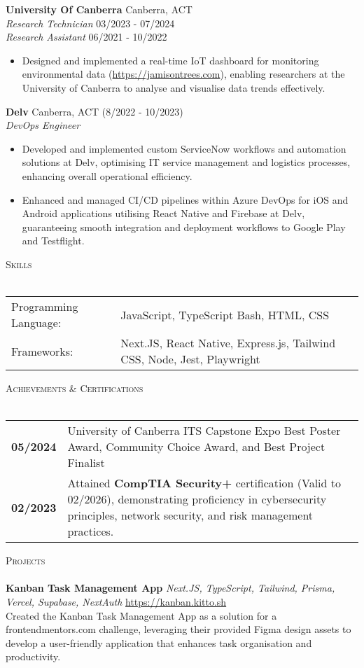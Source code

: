 \documentclass[a4paper]{article}
\newcommand{\lineunder} {
    \vspace*{-8pt} \\
    \hspace*{-18pt} \hrulefill \\
}
\newcommand{\header} [1] {
    {\hspace*{-18pt}\vspace*{6pt} \textsc{#1}}
    \vspace*{-6pt} \lineunder
}
\begin{document}
      \textbf{University Of Canberra} \hfill Canberra, ACT\\
          \textit{Research Technician} \hfill 03/2023 - 07/2024\\
          \textit{Research Assistant} \hfill 06/2021 - 10/2022\\
\begin{itemize} \itemsep 1pt
      \item Designed and implemented a real-time IoT dashboard for monitoring environmental data (\url{https://jamisontrees.com}), enabling researchers at the University of Canberra to analyse and visualise data trends effectively.
\end{itemize}
      \textbf{Delv} \hfill Canberra, ACT (8/2022 - 10/2023)\\
          \textit{DevOps Engineer} 
      \begin{itemize} \itemsep 1pt
            \item Developed and implemented custom ServiceNow workflows and automation solutions at Delv, optimising IT service management and logistics processes, enhancing overall operational efficiency.
            \item 
Enhanced and managed CI/CD pipelines within Azure DevOps for iOS and Android applications utilising React Native and Firebase at Delv, guaranteeing smooth integration and deployment workflows to Google Play and Testflight.
      \end{itemize}
\header{Skills}
\begin{tabular}{V{5cm} @{\hskip 0.6cm} V{12cm}}
Programming Language: & JavaScript, TypeScript Bash, HTML, CSS \\
Frameworks: & Next.JS, React Native, Express.js, Tailwind CSS, Node, Jest, Playwright \\
\end{tabular}
\vspace{2mm}

\header{Achievements \& Certifications }
\begin{tabular}{@{} l p{15cm} @{}}
\textbf{05/2024} & University of Canberra ITS Capstone Expo Best Poster Award, Community Choice Award, and Best Project Finalist \\
\textbf{02/2023} & Attained \textbf{CompTIA Security+} certification (Valid to 02/2026), demonstrating proficiency in cybersecurity principles, network security, and risk management practices. \\
\end{tabular}

\header{Projects}
      {\textbf{Kanban Task Management App}} {\sl Next.JS, TypeScript, Tailwind, Prisma, Vercel, Supabase, NextAuth} \hfill \url{https://kanban.kitto.sh}\\
Created the Kanban Task Management App as a solution for a frontendmentors.com challenge, leveraging their provided Figma design assets to develop a user-friendly application that enhances task organisation and productivity.\\
\vspace*{2mm}

    
\end{document}
